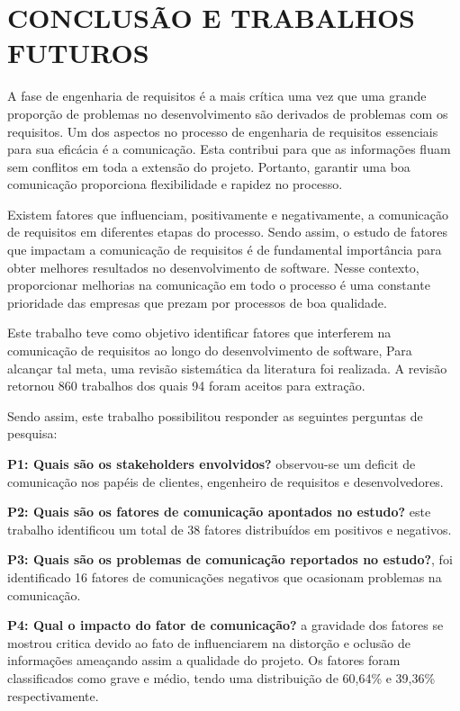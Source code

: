 \chapter{CONCLUSÃO E TRABALHOS FUTUROS}
\label{chap:conclusoes-e-trabalhos-futuros}



A fase de engenharia de requisitos é a mais crítica uma vez que uma grande proporção de problemas no desenvolvimento são derivados de problemas com os requisitos. Um dos aspectos no processo de engenharia de requisitos essenciais para sua eficácia é a comunicação. Esta contribui para que as informações fluam sem conflitos em toda a extensão do projeto. Portanto, garantir uma boa comunicação proporciona flexibilidade e rapidez no processo.

Existem fatores que influenciam, positivamente e negativamente, a comunicação de requisitos em diferentes etapas do processo. Sendo assim, o estudo de fatores que impactam a comunicação de requisitos é de fundamental importância para obter melhores resultados no desenvolvimento de software. Nesse contexto, proporcionar melhorias na comunicação em todo o processo é uma constante prioridade das empresas que prezam por processos de boa qualidade.

Este trabalho teve como objetivo identificar fatores que interferem na comunicação de requisitos ao longo do desenvolvimento de software, Para alcançar tal meta, uma revisão sistemática da literatura foi realizada. A revisão retornou 860 trabalhos dos quais 94 foram aceitos para extração.

Sendo assim, este trabalho possibilitou responder as seguintes perguntas de pesquisa:

\textbf{P1: Quais são os stakeholders envolvidos?} observou-se um deficit de comunicação nos papéis de clientes, engenheiro de requisitos e desenvolvedores.

\textbf{P2: Quais são os fatores de comunicação apontados no estudo?} este trabalho identificou um total de 38 fatores distribuídos em positivos e negativos.

\textbf{P3: Quais são os problemas de comunicação reportados no estudo?}, foi identificado 16 fatores de comunicações negativos que ocasionam problemas na comunicação. 

\textbf{P4: Qual o impacto do fator de comunicação?} a gravidade dos fatores se mostrou critica devido ao fato de influenciarem na distorção e oclusão de informações ameaçando assim a qualidade do projeto. Os fatores foram classificados como grave e médio, tendo uma distribuição de 60,64\%  e 39,36\% respectivamente.

